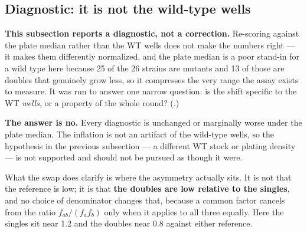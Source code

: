 \subsection{Diagnostic: it is not the wild-type wells}
\label{sec:wtdiag}

\textbf{This subsection reports a diagnostic, not a correction.} Re-scoring against the plate
median rather than the WT wells does not make the numbers right --- it makes them differently
normalized, and the plate median is a poor stand-in for a wild type here because 25 of the 26
strains are mutants and 13 of those are doubles that genuinely grow less, so it compresses the
very range the assay exists to measure. It was run to answer one narrow question: is the shift
specific to the WT \emph{wells}, or a property of the whole round?
(.)


\textbf{The answer is no.} Every diagnostic is unchanged or marginally worse under the plate
median. The inflation is not an artifact of the wild-type wells, so the hypothesis in the
previous subsection --- a different WT stock or plating density --- is not supported and
should not be pursued as though it were.

What the swap does clarify is where the asymmetry actually sits. It is not that the reference
is low; it is that \textbf{the doubles are low relative to the singles}, and no choice of
denominator changes that, because a common factor cancels from the ratio $f_{ab}/(f_a f_b)$
only when it applies to all three equally. Here the singles sit near 1.2 and the doubles near
0.8 against either reference.

